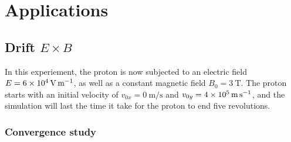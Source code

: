 \documentclass[a4paper,12pt,twoside]{article}
\begin{document}
\section{Applications}
\subsection{Drift $E\times B$}
In this experiement, the proton is now subjected to an electric field $E=\SI{6d4}{\volt\per\meter}$, as well as a constant magnetic field $B_0 = \SI{3}{\tesla}$.
The proton starts with an initial velocity of $v_{0x}=\SI{0}{\meter\per\second}$ and $v_{0y}=\SI{4d5}{\meter\per\second}$, and the simulation will last the time it take for the proton to end five revolutions.

\subsubsection{Convergence study}
\end{document}

